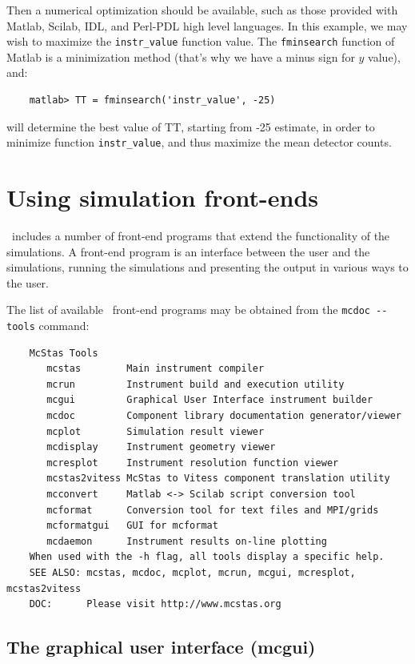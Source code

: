 Then a numerical optimization should be available, such as those provided with Matlab, Scilab, IDL, and Perl-PDL high level languages. In this example, we may wish to maximize the \verb+instr_value+ function value. The \verb+fminsearch+ function of Matlab is a minimization method (that's why we have a minus sign for $y$ value), and:
\begin{verbatim}
    matlab> TT = fminsearch('instr_value', -25)
\end{verbatim}
will determine the best value of TT, starting from -25 estimate, in order to
minimize function \verb+instr_value+, and thus maximize the mean detector
counts.

\section{Using simulation front-ends}
\label{s:frontends}

\MCS\ includes a number of front-end programs that extend the
functionality of the simulations. A front-end program is an interface
between the user and the simulations, running the simulations and
presenting the output in various ways to the user.

The list of available \MCS\ front-end programs may be obtained from the
\verb+mcdoc --tools+ command:
\begin{verbatim}
    McStas Tools
       mcstas        Main instrument compiler
       mcrun         Instrument build and execution utility
       mcgui         Graphical User Interface instrument builder
       mcdoc         Component library documentation generator/viewer
       mcplot        Simulation result viewer
       mcdisplay     Instrument geometry viewer
       mcresplot     Instrument resolution function viewer
       mcstas2vitess McStas to Vitess component translation utility
       mcconvert     Matlab <-> Scilab script conversion tool
       mcformat      Conversion tool for text files and MPI/grids
       mcformatgui   GUI for mcformat
       mcdaemon      Instrument results on-line plotting
    When used with the -h flag, all tools display a specific help.
    SEE ALSO: mcstas, mcdoc, mcplot, mcrun, mcgui, mcresplot, mcstas2vitess
    DOC:      Please visit http://www.mcstas.org
\end{verbatim}

\subsection{The graphical user interface (mcgui)}
\label{s:mcgui}

